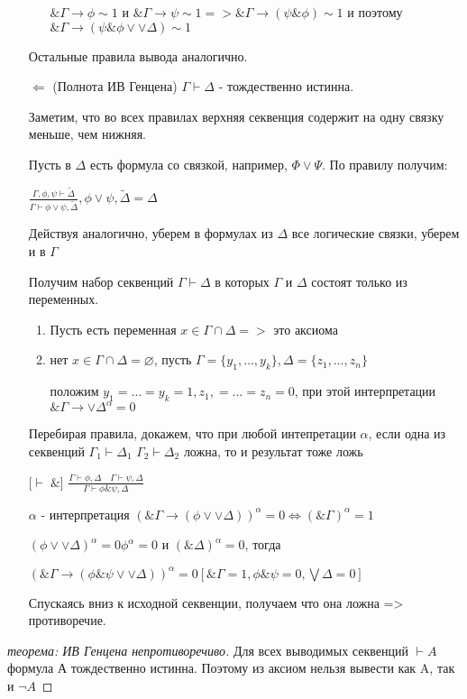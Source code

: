 \documentclass[a4paper]{article}
\theoremstyle{definition}
\theoremstyle{remark}
\begin{document}
\begin{itemize}
\begin{enumerate}
            $\& \Gamma \to \phi \sim 1$ и $\& \Gamma \to \psi \sim 1 => \& \Gamma \to (\psi\&\phi)\sim 1$ и поэтому $\& \Gamma \to (\psi\&\phi\vee \vee\Delta)\sim 1$
        \end{enumerate}
        Остальные правила вывода аналогично.
        \item[$\Leftarrow$] (Полнота ИВ Генцена)
        $\Gamma \vdash \Delta$ - тождественно истинна.

        Заметим, что во всех правилах верхняя секвенция содержит на одну связку меньше, чем нижняя.

        Пусть в $\Delta$ есть формула со связкой, например, $\Phi\vee \Psi$. По правилу получим:

        $\frac{\Gamma, \phi, \psi\vdash \widetilde{\Delta} }{\Gamma \vdash \phi\vee\psi,  \widetilde{\Delta}}, \phi\vee\psi, \widetilde{\Delta} = \Delta$

        Действуя аналогично, уберем в формулах из $\Delta $ все логические связки, уберем и в $\Gamma$

        Получим набор секвенций $\Gamma \vdash \Delta$ в которых $\Gamma$ и $\Delta$ состоят только из переменных.
        \begin{enumerate}
            \item Пусть есть переменная $x \in \Gamma \cap \Delta=>$ это аксиома
            \item нет $x \in \Gamma \cap \Delta=\varnothing$, пусть
            $\Gamma = \{ y_1, \dots, y_k \}, \Delta = \{ z_1, \dots, z_n \}$

            положим $y_1 = \dots = y_k = 1, z_1, = \dots = z_n = 0$, при этой интерпретации $\&\Gamma \to \vee\Delta^\alpha = 0$
        \end{enumerate}
        Перебирая правила, докажем, что при любой интепретации $\alpha$, если одна из 
        секвенций $\Gamma_1 \vdash \Delta_1$ $\Gamma_2 \vdash \Delta_2$ ложна, то и результат тоже ложь

        [$\vdash\;\&$] $\frac{\Gamma \vdash \phi, \Delta \quad \Gamma \vdash \psi, \Delta}{\Gamma \vdash \phi\&\psi, \Delta}$

        $\alpha$ - интерпретация $(\& \Gamma \to (\phi \vee \vee \Delta ))^\alpha = 0\Leftrightarrow (\& \Gamma)^\alpha = 1$

        $(\phi\vee \vee \Delta)^\alpha = 0$$\phi^\alpha = 0$ и $(\& \Delta)^\alpha = 0$, тогда 

        $(\& \Gamma \to (\phi\&\psi \vee \vee\Delta))^\alpha = 0 [\& \Gamma=1, \phi\&\psi = 0, \bigvee\Delta = 0]$ 

        Спускаясь вниз к исходной секвенции, получаем что она ложна => противоречие.
    \end{itemize}
    \begin{proof}[теорема: ИВ Генцена непротиворечиво]
        Для всех выводимых секвенций $\vdash A$ формула А тождественно истинна. Поэтому из аксиом нельзя вывести как A, так и $\neg A$
    \end{proof}
\end{document}
